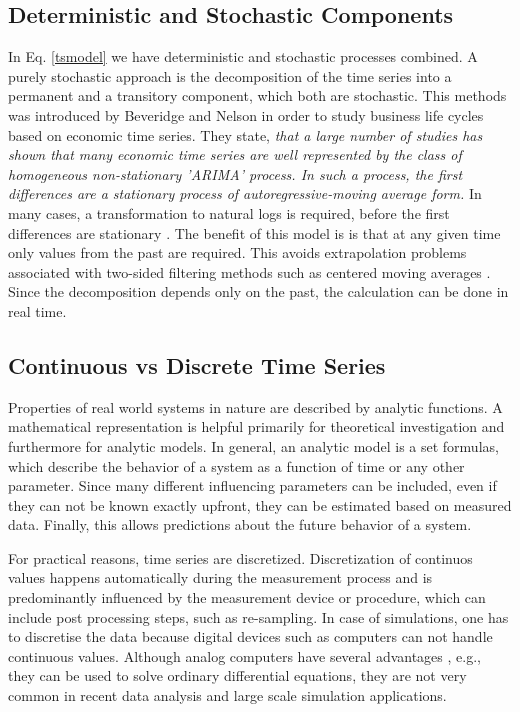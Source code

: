 \documentclass[a4paper,10pt]{scrbook}
\begin{document}
\subsection{Deterministic and Stochastic Components}
In Eq. \ref{tsmodel} we have deterministic and stochastic processes combined. A purely stochastic approach is the decomposition of the time series into a permanent and a transitory component, which both are stochastic. This methods was introduced by Beveridge and Nelson \cite{BEVERIDGE1981151} in order to study business life cycles based on economic time series. They state, \textit{that a large number of studies has shown that many economic time series are well represented by the class of homogeneous non-stationary 'ARIMA' process. In such a process, the first differences are a stationary process of autoregressive-moving average form.} In many cases, a transformation to natural logs is required, before the first differences are stationary \cite{BEVERIDGE1981151}. The benefit of this model is is that at any given time only values from the past are required. This avoids extrapolation problems associated with two-sided filtering methods such as centered moving averages \cite{BEVERIDGE1981151}. Since the decomposition depends only on the past, the calculation can be done in real time. 

\subsection{Continuous vs Discrete Time Series}
Properties of real world systems in nature are described by analytic functions. A mathematical representation is helpful primarily for theoretical investigation and furthermore for analytic models. In general, an analytic model is a set formulas, which describe the behavior of a system as a function of time or any other parameter. Since many different influencing parameters can be included, even if they can not be known exactly upfront, they can be estimated based on measured data. Finally, this allows predictions about the future behavior of a system. 

For practical reasons, time series are discretized. Discretization of continuos values happens automatically during the measurement process and is predominantly influenced by the measurement device or procedure, which can include post processing steps, such as re-sampling. In case of simulations, one has to discretise the data because digital devices such as computers can not handle continuous values. Although analog computers have several advantages \cite{UlmanBOOK}, e.g., they can be used to solve ordinary differential equations, they are not very common in recent data analysis and large scale simulation applications.   
\end{document}
